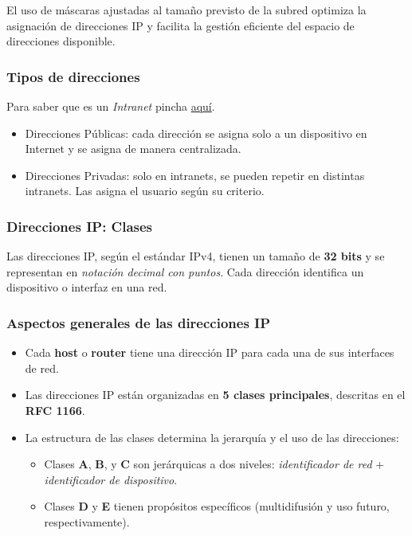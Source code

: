 \documentclass[a4paper,12pt]{article}
\begin{document}
El uso de máscaras ajustadas al tamaño previsto de la subred optimiza la asignación de direcciones IP y facilita la gestión eficiente del espacio de direcciones disponible.


\subsubsection{Tipos de direcciones}
Para saber que es un \textit{Intranet} pincha \href{https://github.com/ElblogdeIsmael/ElblogdeIsmael.github.io/blob/main/Asignaturas/Tercer\%20A\%C3\%B1o/FR/Resumenes/ETSIIT/intranet.md}{aquí}.
\begin{itemize}
    \item Direcciones Públicas: cada dirección se asigna solo a un dispositivo en Internet y se asigna de manera centralizada.
    \item Direcciones Privadas: solo en intranets, se pueden repetir en distintas intranets. Las asigna el usuario según su criterio.
\end{itemize}



\subsubsection{Direcciones IP: Clases}

Las direcciones IP, según el estándar IPv4, tienen un tamaño de \textbf{32 bits} y se representan en \textit{notación decimal con puntos}. Cada dirección identifica un dispositivo o interfaz en una red. 

\subsubsection*{Aspectos generales de las direcciones IP}
\begin{itemize}
    \item Cada \textbf{host} o \textbf{router} tiene una dirección IP para cada una de sus interfaces de red.
    \item Las direcciones IP están organizadas en \textbf{5 clases principales}, descritas en el \textbf{RFC 1166}.
    \item La estructura de las clases determina la jerarquía y el uso de las direcciones:
    \begin{itemize}
        \item Clases \textbf{A}, \textbf{B}, y \textbf{C} son jerárquicas a dos niveles: \textit{identificador de red} + \textit{identificador de dispositivo}.
        \item Clases \textbf{D} y \textbf{E} tienen propósitos específicos (multidifusión y uso futuro, respectivamente).
    \end{itemize}
\end{itemize}
\end{document}
